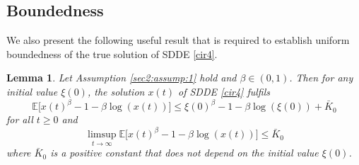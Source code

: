 \documentclass[11pt]{article}
\newtheorem{lemma}[definition]{Lemma}
\begin{document}
\subsection{Boundedness}
We also present the following useful result that is required to establish uniform boundedness of the true solution of SDDE \eqref{cir4}.
\begin{lemma}\label{bound}
Let Assumption \ref{sec2:assump:1} hold and $\beta\in(0,1)$. Then for any initial value $\xi(0)$, the solution $x(t)$ of \textup{SDDE} \eqref{cir4} fulfils 
\begin{equation*}
\mathbb{E}\Big[ x(t)^{\beta}-1-\beta\log(x(t)) \Big]\le \xi(0)^{\beta}-1-\beta\log(\xi(0))+\bar{K}_0
\end{equation*}
for all $t\ge 0$ and 
\begin{equation*}
\underset{t\rightarrow \infty}{\limsup}\mathbb{E}\Big[x(t)^{\beta}-1-\beta\log(x(t))\Big]\le \bar{K}_0
\end{equation*}
where $\bar{K}_0$ is a positive constant that does not depend on the initial value $\xi(0)$.
\end{lemma}
\end{document}
